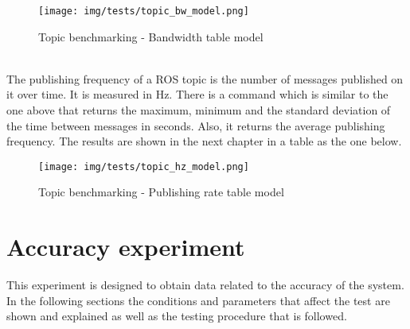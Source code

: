 \begin{itemize}
		\begin{figure}[h]
				\begin{center}
			    \texttt{[image: img/tests/topic\_bw\_model.png]}
				\caption[Topic benchmarking - Bandwidth table model]{Topic benchmarking - Bandwidth table model}
				\end{center}
		\end{figure}
		\\

		The publishing frequency of a ROS topic is the number of messages published on it over time. 
		It is measured in Hz. 
		There is a command which is similar to the one above that returns the maximum, minimum and the standard deviation of the time between messages in seconds. 
		Also, it returns the average publishing frequency.  
		The results are shown in the next chapter in a table as the one below. 

		\begin{figure}[h]
				\begin{center}
			    \texttt{[image: img/tests/topic\_hz\_model.png]}
				\caption[Topic benchmarking - Publishing rate table model]{Topic benchmarking - Publishing rate table model}
				\end{center}
		\end{figure}
			\end{itemize}

\newpage

\section{Accuracy experiment}

	This experiment is designed to obtain data related to the accuracy of the system. 
	\\

	In the following sections the conditions and parameters that affect the test are shown and explained as well as the testing procedure that is followed. \\[0.5cm]

